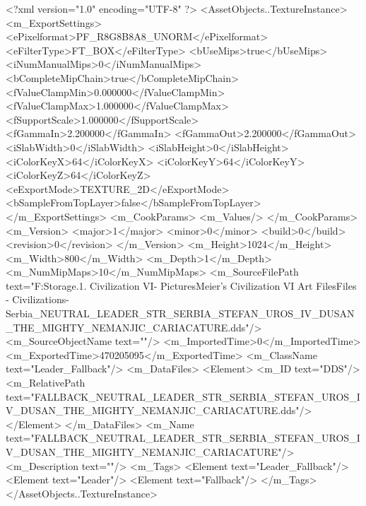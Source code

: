 <?xml version="1.0" encoding="UTF-8" ?>
<AssetObjects..TextureInstance>
	<m_ExportSettings>
		<ePixelformat>PF_R8G8B8A8_UNORM</ePixelformat>
		<eFilterType>FT_BOX</eFilterType>
		<bUseMips>true</bUseMips>
		<iNumManualMips>0</iNumManualMips>
		<bCompleteMipChain>true</bCompleteMipChain>
		<fValueClampMin>0.000000</fValueClampMin>
		<fValueClampMax>1.000000</fValueClampMax>
		<fSupportScale>1.000000</fSupportScale>
		<fGammaIn>2.200000</fGammaIn>
		<fGammaOut>2.200000</fGammaOut>
		<iSlabWidth>0</iSlabWidth>
		<iSlabHeight>0</iSlabHeight>
		<iColorKeyX>64</iColorKeyX>
		<iColorKeyY>64</iColorKeyY>
		<iColorKeyZ>64</iColorKeyZ>
		<eExportMode>TEXTURE_2D</eExportMode>
		<bSampleFromTopLayer>false</bSampleFromTopLayer>
	</m_ExportSettings>
	<m_CookParams>
		<m_Values/>
	</m_CookParams>
	<m_Version>
		<major>1</major>
		<minor>0</minor>
		<build>0</build>
		<revision>0</revision>
	</m_Version>
	<m_Height>1024</m_Height>
	<m_Width>800</m_Width>
	<m_Depth>1</m_Depth>
	<m_NumMipMaps>10</m_NumMipMaps>
	<m_SourceFilePath text="F:\Mod Storage\2.1. Civilization VI\Mods\Archive - Pictures\Sid Meier's Civilization VI Art Files\Art Files - Civilizations\Civilization - Serbia\FALLBACK_NEUTRAL_LEADER_STR_SERBIA_STEFAN_UROS_IV_DUSAN_THE_MIGHTY_NEMANJIC_CARIACATURE.dds"/>
	<m_SourceObjectName text=""/>
	<m_ImportedTime>0</m_ImportedTime>
	<m_ExportedTime>470205095</m_ExportedTime>
	<m_ClassName text="Leader_Fallback"/>
	<m_DataFiles>
		<Element>
			<m_ID text="DDS"/>
			<m_RelativePath text="FALLBACK_NEUTRAL_LEADER_STR_SERBIA_STEFAN_UROS_IV_DUSAN_THE_MIGHTY_NEMANJIC_CARIACATURE.dds"/>
		</Element>
	</m_DataFiles>
	<m_Name text="FALLBACK_NEUTRAL_LEADER_STR_SERBIA_STEFAN_UROS_IV_DUSAN_THE_MIGHTY_NEMANJIC_CARIACATURE"/>
	<m_Description text=""/>
	<m_Tags>
		<Element text="Leader_Fallback"/>
		<Element text="Leader"/>
		<Element text="Fallback"/>
	</m_Tags>
</AssetObjects..TextureInstance>

